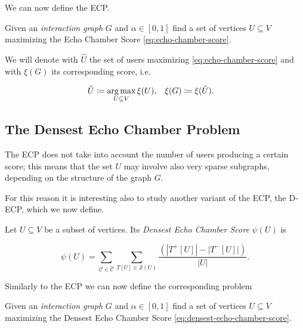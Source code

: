 We can now define the \acrfull{ECP}.

\begin{problem}
Given an \emph{interaction graph} $G$ and $\alpha \in [0, 1]$ find a set of vertices $U \subseteq
	V$ maximizing the Echo Chamber Score \eqref{eq:echo-chamber-score}.
\end{problem}

We will denote with $\hat{U}$ the set of users maximizing
\eqref{eq:echo-chamber-score} and with $\xi(G)$ its corresponding score, i.e.

\begin{align*}
	\hat{U} & \coloneqq \operatorname*{arg\,max}_{U \subseteq V} \xi(U), & \xi(G) & \coloneqq
	\xi(\hat{U}).
\end{align*}

\subsection{The Densest Echo Chamber Problem}%
\label{sub:the_densest_echo_chamber_problem}

The \acrshort{ECP} does not take into account the number of users producing a
certain score; this means that the set $U$ may involve also very sparse
subgraphs, depending on the structure of the graph $G$.

For this reason it is interesting also to study another variant of the
\acrshort{ECP}, the \acrfull{D-ECP}, which we now define.

\begin{definition}
	Let $U \subseteq V$ be a subset of vertices. Its \emph{Densest Echo Chamber Score}
	$\psi(U)$ is

	\begin{equation}
		\label{eq:densest-echo-chamber-score}
		\psi(U) = \sum^{}_{\mathcal{C} \in \mathcal{\hat{C}}} \sum^{}_{T[U] \in
		\mathcal{S} (U)} \frac{(|T^{+} [U]| - |T ^{-} [U]|)}{|U|}.
	\end{equation}
\end{definition}

Similarly to the \acrshort{ECP} we can now define the corresponding problem

\begin{problem}
Given an \emph{interaction graph} $G$ and $\alpha \in [0, 1]$ find a set of vertices $U \subseteq
	V$ maximizing the Densest Echo Chamber Score \eqref{eq:densest-echo-chamber-score}.
\end{problem}

